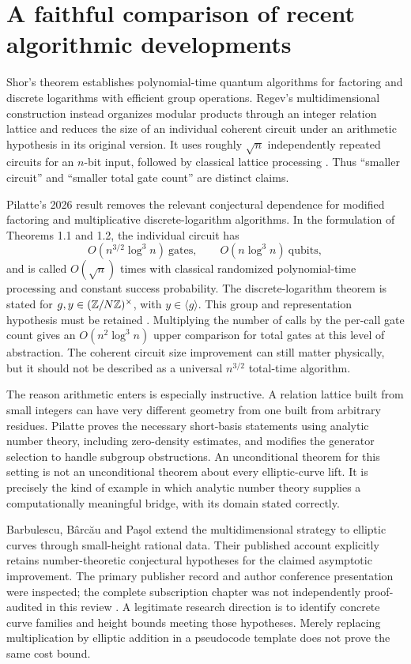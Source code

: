 \section{A faithful comparison of recent algorithmic developments}
Shor's theorem establishes polynomial-time quantum algorithms for factoring and discrete logarithms with efficient group operations. Regev's multidimensional construction instead organizes modular products through an integer relation lattice and reduces the size of an individual coherent circuit under an arithmetic hypothesis in its original version. It uses roughly $\sqrt n$ independently repeated circuits for an $n$-bit input, followed by classical lattice processing \cite{Shor,RegevFactoring}. Thus ``smaller circuit'' and ``smaller total gate count'' are distinct claims.

Pilatte's 2026 result removes the relevant conjectural dependence for modified factoring and multiplicative discrete-logarithm algorithms. In the formulation of Theorems 1.1 and 1.2, the individual circuit has
\[
 O(n^{3/2}\log^3 n)\ \text{gates},\qquad O(n\log^3 n)\ \text{qubits},
\]
and is called $O(\sqrt n)$ times with classical randomized polynomial-time processing and constant success probability. The discrete-logarithm theorem is stated for $g,y\in(\mathbb{Z}/N\mathbb{Z})^\times$, with $y\in\langle g\rangle$. This group and representation hypothesis must be retained \cite{Pilatte2026}. Multiplying the number of calls by the per-call gate count gives an $O(n^2\log^3 n)$ upper comparison for total gates at this level of abstraction. The coherent circuit size improvement can still matter physically, but it should not be described as a universal $n^{3/2}$ total-time algorithm.

The reason arithmetic enters is especially instructive. A relation lattice built from small integers can have very different geometry from one built from arbitrary residues. Pilatte proves the necessary short-basis statements using analytic number theory, including zero-density estimates, and modifies the generator selection to handle subgroup obstructions. An unconditional theorem for this setting is not an unconditional theorem about every elliptic-curve lift. It is precisely the kind of example in which analytic number theory supplies a computationally meaningful bridge, with its domain stated correctly.

Barbulescu, B\^arc\u{a}u and Pa\c{s}ol extend the multidimensional strategy to elliptic curves through small-height rational data. Their published account explicitly retains number-theoretic conjectural hypotheses for the claimed asymptotic improvement. The primary publisher record and author conference presentation were inspected; the complete subscription chapter was not independently proof-audited in this review \cite{Barbulescu2025,BarbulescuSlides}. A legitimate research direction is to identify concrete curve families and height bounds meeting those hypotheses. Merely replacing multiplication by elliptic addition in a pseudocode template does not prove the same cost bound.

